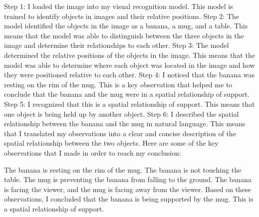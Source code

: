 \begin{enumerate}
\begin{enumerate}
        Step 1: I loaded the image into my visual recognition model. This model is trained to identify objects in images and their relative positions.
        Step 2: The model identified the objects in the image as a banana, a mug, and a table. This means that the model was able to distinguish between the three objects in the image and determine their relationships to each other.
        Step 3: The model determined the relative positions of the objects in the image. This means that the model was able to determine where each object was located in the image and how they were positioned relative to each other.
        Step 4: I noticed that the banana was resting on the rim of the mug. This is a key observation that helped me to conclude that the banana and the mug were in a spatial relationship of support.
        Step 5: I recognized that this is a spatial relationship of support. This means that one object is being held up by another object.
        Step 6: I described the spatial relationship between the banana and the mug in natural language. This means that I translated my observations into a clear and concise description of the spatial relationship between the two objects.
        Here are some of the key observations that I made in order to reach my conclusion:
        
        The banana is resting on the rim of the mug.
        The banana is not touching the table.
        The mug is preventing the banana from falling to the ground.
        The banana is facing the viewer, and the mug is facing away from the viewer.
        Based on these observations, I concluded that the banana is being supported by the mug. This is a spatial relationship of support.
        

\end{enumerate}
\end{enumerate}
